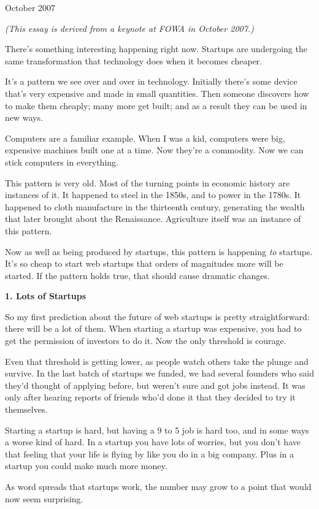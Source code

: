 October 2007

\emph{(This essay is derived from a keynote at FOWA in October 2007.)}

There's something interesting happening right now. Startups are
undergoing the same transformation that technology does when it becomes
cheaper.

It's a pattern we see over and over in technology. Initially there's
some device that's very expensive and made in small quantities. Then
someone discovers how to make them cheaply; many more get built; and as
a result they can be used in new ways.

Computers are a familiar example. When I was a kid, computers were big,
expensive machines built one at a time. Now they're a commodity. Now we
can stick computers in everything.

This pattern is very old. Most of the turning points in economic history
are instances of it. It happened to steel in the 1850s, and to power in
the 1780s. It happened to cloth manufacture in the thirteenth century,
generating the wealth that later brought about the Renaissance.
Agriculture itself was an instance of this pattern.

Now as well as being produced by startups, this pattern is happening
\emph{to} startups. It's so cheap to start web startups that orders of
magnitudes more will be started. If the pattern holds true, that should
cause dramatic changes.

\textbf{1. Lots of Startups}

So my first prediction about the future of web startups is pretty
straightforward: there will be a lot of them. When starting a startup
was expensive, you had to get the permission of investors to do it. Now
the only threshold is courage.

Even that threshold is getting lower, as people watch others take the
plunge and survive. In the last batch of startups we funded, we had
several founders who said they'd thought of applying before, but weren't
sure and got jobs instead. It was only after hearing reports of friends
who'd done it that they decided to try it themselves.

Starting a startup is hard, but having a 9 to 5 job is hard too, and in
some ways a worse kind of hard. In a startup you have lots of worries,
but you don't have that feeling that your life is flying by like you do
in a big company. Plus in a startup you could make much more money.

As word spreads that startups work, the number may grow to a point that
would now seem surprising.

